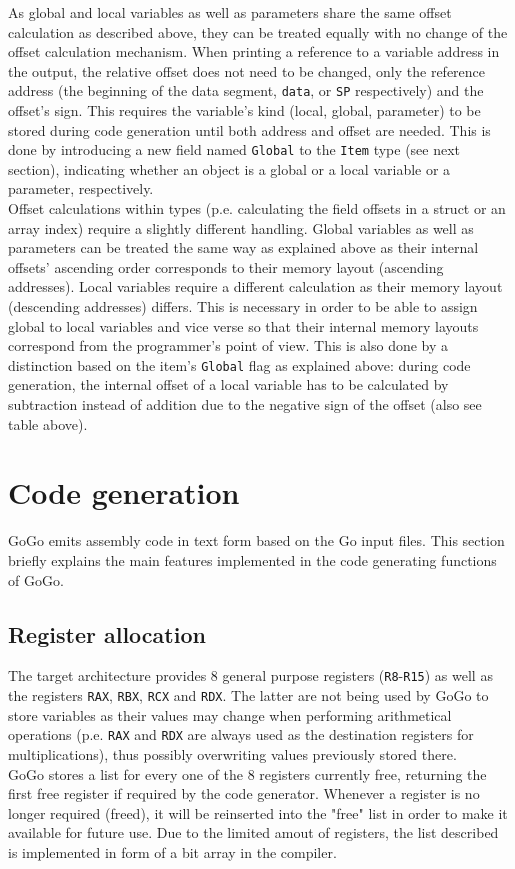 \documentclass[a4paper]{scrartcl}
\let\chapter\section
\let\section\subsection
\let\subsection\subsubsection
\let\subsubsection\paragraph
\let\paragraph\subparagraph
\let\subparagraph\undefined
\begin{document}
      As global and local variables as well as parameters share the same offset calculation as described above, they can be treated equally with no change of the offset calculation mechanism. When printing a reference to a variable address in the output, the relative offset does not need to be changed, only the reference address (the beginning of the data segment, \texttt{data}, or \texttt{SP} respectively) and the offset's sign. This requires the variable's kind (local, global, parameter) to be stored during code generation until both address and offset are needed. This is done by introducing a new field named \texttt{Global} to the \texttt{Item} type (see next section), indicating whether an object is a global or a local variable or a parameter, respectively.\\
      Offset calculations within types (p.e. calculating the field offsets in a struct or an array index) require a slightly different handling. Global variables as well as parameters can be treated the same way as explained above as their internal offsets' ascending order corresponds to their memory layout (ascending addresses). Local variables require a different calculation as their memory layout (descending addresses) differs. This is necessary in order to be able to assign global to local variables and vice verse so that their internal memory layouts correspond from the programmer's point of view. This is also done by a distinction based on the item's \texttt{Global} flag as explained above: during code generation, the internal offset of a local variable has to be calculated by subtraction instead of addition due to the negative sign of the offset (also see table above).

  \chapter{Code generation}
    GoGo emits assembly code in text form based on the Go input files. This section briefly explains the main features implemented in the code generating functions of GoGo.

    \section{Register allocation}
        The target architecture provides 8 general purpose registers (\texttt{R8}-\texttt{R15}) as well as the registers \texttt{RAX}, \texttt{RBX}, \texttt{RCX} and \texttt{RDX}\cite{int09}. The latter are not being used by GoGo to store variables as their values may change when performing arithmetical operations (p.e. \texttt{RAX} and \texttt{RDX} are always used as the destination registers for multiplications), thus possibly overwriting values previously stored there.\\
        GoGo stores a list for every one of the 8 registers currently free, returning the first free register if required by the code generator. Whenever a register is no longer required (freed), it will be reinserted into the "free" list in order to make it available for future use. Due to the limited amout of registers, the list described is implemented in form of a bit array in the compiler.
\end{document}
